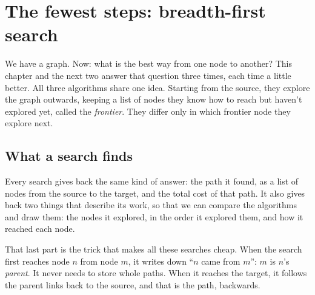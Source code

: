 \chapter{The fewest steps: breadth-first search}\label{ch:bfs}

We have a graph. Now: what is the best way from one node to another? This
chapter and the next two answer that question three times, each time a
little better. All three algorithms share one idea. Starting from the
source, they explore the graph outwards, keeping a list of nodes they know
how to reach but haven't explored yet, called the \emph{frontier}. They
differ only in which frontier node they explore next.

\section{What a search finds}

Every search gives back the same kind of answer: the path it found, as a
list of nodes from the source to the target, and the total cost of that
path. It also gives back two things that describe its work, so that we can
compare the algorithms and draw them: the nodes it explored, in the order
it explored them, and how it reached each node.

That last part is the trick that makes all these searches cheap. When the
search first reaches node $n$ from node $m$, it writes down
``$n$ came from $m$'': $m$ is $n$'s \emph{parent}. It never needs to store
whole paths. When it reaches the target, it follows the parent links back
to the source, and that is the path, backwards.

